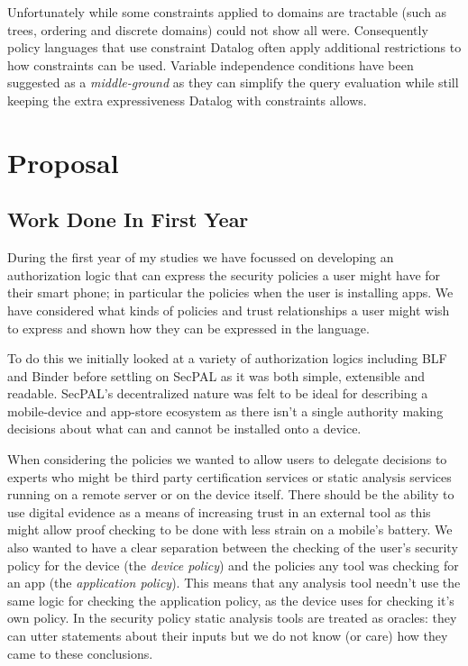 \documentclass[a4paper]{article}
\begin{document}
Unfortunately while some constraints applied to domains are tractable (such as
trees, ordering and discrete domains) \citeauthor*{Li:2003:ix} could not show
all were.  Consequently policy languages that use constraint Datalog often apply
additional restrictions to how constraints can be used.  Variable independence
conditions\cite{Chomicki:2000tz} have been suggested as a \emph{middle-ground}
as they can simplify the query evaluation while still keeping the extra
expressiveness Datalog with constraints allows.


\section{Proposal}

\subsection{Work Done In First Year}

During the first year of my studies we have focussed on developing an
authorization logic that can express the security policies a user might have for
their smart phone; in particular the policies when the user is installing apps.
We have considered what kinds of policies and trust
relationships a user might wish to express and shown how they can be expressed
in the language.

To do this we initially looked at a variety of authorization logics including
BLF\cite{Whitehead:2004bu} and Binder\cite{DeTreville:2002ff} before settling on
SecPAL as it was both simple, extensible and readable.  SecPAL's decentralized
nature was felt to be ideal for describing a mobile-device and app-store
ecosystem as there isn't a single authority making decisions about what can and
cannot be installed onto a device.  

When considering the policies we wanted to allow users to delegate decisions to
experts who might be third party certification services or static analysis
services running on a remote server or on the device itself.  There should be
the ability to use digital evidence\cite{Stark:2009uc} as a means of increasing
trust in an external tool as this might allow proof checking to be done with
less strain on a mobile's battery.  We also wanted to have a clear separation
between the checking of the user's security policy for the device (the
\emph{device policy}) and the policies any tool was checking for an app (the
\emph{application policy}).  This means that any analysis tool needn't use the
same logic for checking the application policy, as the device uses for checking
it's own policy.  In the security policy static analysis tools are treated as
oracles: they can utter statements about their inputs but we do not know (or
care) how they came to these conclusions.
\end{document}
